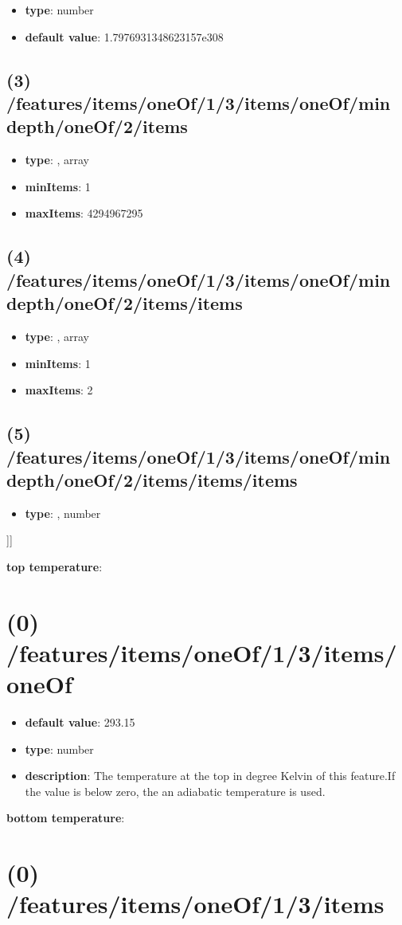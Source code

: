 \begin{itemize}[leftmargin=4em]\item {\bf type}: number\item {\bf default value}: 1.7976931348623157e308
\end{itemize}\subsection{(3) /features/items/oneOf/1/3/items/oneOf/min depth/oneOf/2/items}
\begin{itemize}[leftmargin=3em]\item {\bf type}: , array\item {\bf minItems}: 1
\item {\bf maxItems}: 4294967295
\end{itemize}\subsection{(4) /features/items/oneOf/1/3/items/oneOf/min depth/oneOf/2/items/items}
\begin{itemize}[leftmargin=4em]\item {\bf type}: , array\item {\bf minItems}: 1
\item {\bf maxItems}: 2
\end{itemize}\subsection{(5) /features/items/oneOf/1/3/items/oneOf/min depth/oneOf/2/items/items/items}
\begin{itemize}[leftmargin=5em]\item {\bf type}: , number\end{itemize}]]\item {\bf top temperature}: \section{(0) /features/items/oneOf/1/3/items/oneOf}
\begin{itemize}[leftmargin=0em]\item {\bf default value}: 293.15
\item {\bf type}: number
\item {\bf description}: The temperature at the top in degree Kelvin of this feature.If the value is below zero, the an adiabatic temperature is used.
\end{itemize}\item {\bf bottom temperature}: \section{(0) /features/items/oneOf/1/3/items}
